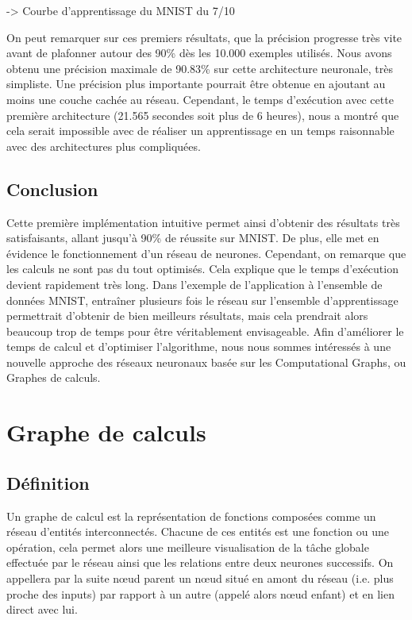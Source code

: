\documentclass{report}
\begin{document}
-> Courbe d'apprentissage du MNIST du 7/10

On peut remarquer sur ces premiers résultats, que la précision progresse très vite avant de plafonner autour des 90\% dès les 10.000 exemples utilisés. Nous avons obtenu une précision maximale de 90.83\% sur cette architecture neuronale, très simpliste. Une précision plus importante pourrait être obtenue en ajoutant au moins une couche cachée au réseau. Cependant, le temps d'exécution avec cette première architecture (21.565 secondes soit plus de 6 heures), nous a montré que cela serait impossible avec de réaliser un apprentissage en un temps raisonnable avec des architectures plus compliquées.
\label{resultat_premiere_implementation}


\section{Conclusion}
Cette première implémentation intuitive permet ainsi d'obtenir des résultats très satisfaisants, allant jusqu'à 90\% de réussite sur MNIST. De plus, elle met en évidence le fonctionnement d'un réseau de neurones. Cependant, on remarque que les calculs ne sont pas du tout optimisés. Cela explique que le temps d'exécution devient rapidement très long. Dans l'exemple de l'application à l'ensemble de données MNIST, entraîner plusieurs fois le réseau sur l'ensemble d'apprentissage permettrait d'obtenir de bien meilleurs résultats, mais cela prendrait alors beaucoup trop de temps pour être véritablement envisageable.
Afin d'améliorer le temps de calcul et d'optimiser l'algorithme, nous nous sommes intéressés à une nouvelle approche des réseaux neuronaux basée sur les Computational Graphs, ou Graphes de calculs.

\chapter{Graphe de calculs}

\section{Définition}

Un graphe de calcul est la représentation de fonctions composées comme un réseau d’entités interconnectés. Chacune de ces entités est une fonction ou une opération, cela permet alors une meilleure visualisation de la tâche globale effectuée par le réseau ainsi que les relations entre deux neurones successifs. On appellera par la suite nœud parent un nœud situé en amont du réseau (i.e. plus proche des inputs) par rapport à un autre (appelé alors nœud enfant) et en lien direct avec lui. 
\end{document}
